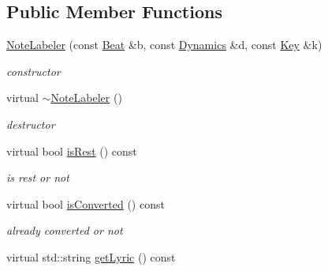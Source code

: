 \subsection*{\-Public \-Member \-Functions}
\begin{DoxyCompactItemize}
\item 
\hyperlink{classsinsy_1_1NoteLabeler_a657bab991e0cdd62069a5f69aa12d6ca}{\-Note\-Labeler} (const \hyperlink{classsinsy_1_1Beat}{\-Beat} \&b, const \hyperlink{classsinsy_1_1Dynamics}{\-Dynamics} \&d, const \hyperlink{classsinsy_1_1Key}{\-Key} \&k)
\begin{DoxyCompactList}\small\item\em constructor \end{DoxyCompactList}\item 
\hypertarget{classsinsy_1_1NoteLabeler_aa3e344f5248b5e996fa945105e936a5e}{virtual \hyperlink{classsinsy_1_1NoteLabeler_aa3e344f5248b5e996fa945105e936a5e}{$\sim$\-Note\-Labeler} ()}\label{classsinsy_1_1NoteLabeler_aa3e344f5248b5e996fa945105e936a5e}

\begin{DoxyCompactList}\small\item\em destructor \end{DoxyCompactList}\item 
\hypertarget{classsinsy_1_1NoteLabeler_aef26082ba5e3ae1547922993f0c03214}{virtual bool \hyperlink{classsinsy_1_1NoteLabeler_aef26082ba5e3ae1547922993f0c03214}{is\-Rest} () const }\label{classsinsy_1_1NoteLabeler_aef26082ba5e3ae1547922993f0c03214}

\begin{DoxyCompactList}\small\item\em is rest or not \end{DoxyCompactList}\item 
\hypertarget{classsinsy_1_1NoteLabeler_aa237e645eec582031e05e873e98d510e}{virtual bool \hyperlink{classsinsy_1_1NoteLabeler_aa237e645eec582031e05e873e98d510e}{is\-Converted} () const }\label{classsinsy_1_1NoteLabeler_aa237e645eec582031e05e873e98d510e}

\begin{DoxyCompactList}\small\item\em already converted or not \end{DoxyCompactList}\item 
\hypertarget{classsinsy_1_1NoteLabeler_aa30afe19db901d524759dca56e91b2aa}{virtual std\-::string \hyperlink{classsinsy_1_1NoteLabeler_aa30afe19db901d524759dca56e91b2aa}{get\-Lyric} () const }\label{classsinsy_1_1NoteLabeler_aa30afe19db901d524759dca56e91b2aa}


\end{DoxyCompactItemize}
